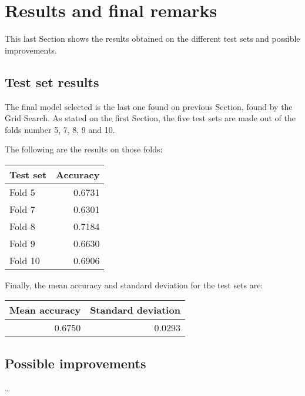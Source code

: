 \section{Results and final remarks}
\label{results}

This last Section shows the results obtained on the different 
test sets and possible improvements.

\subsection{Test set results}
The final model selected is the last one found on previous Section, 
found by the Grid Search.
As stated on the first Section, the five test sets are made out of the 
folds number 5, 7, 8, 9 and 10. 

The following are the results on those folds:

\begin{center}
    \begin{tabular}{ |l|r| } 
        \hline
        Test set & Accuracy\\
        \hline
        Fold 5 & 0.6731 \\
        Fold 7 & 0.6301 \\
        Fold 8 & 0.7184 \\
        Fold 9 & 0.6630 \\
        Fold 10 & 0.6906 \\ 
        \hline
    \end{tabular}
\end{center}

Finally, the mean accuracy and standard deviation for the test sets are: 
\begin{center}
    \begin{tabular}{ |r|r| } 
        \hline
        Mean accuracy & Standard deviation\\
        \hline
        0.6750 & 0.0293 \\
        \hline
    \end{tabular}
\end{center}

\subsection{Possible improvements}
\dots